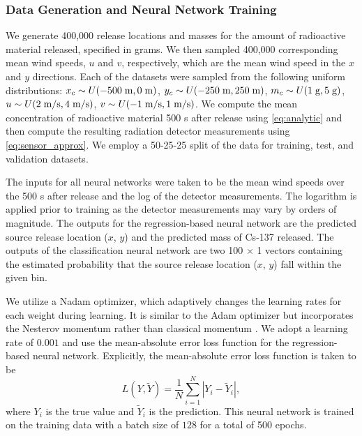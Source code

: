 \documentclass[sn-mathphys-ay]{sn-jnl}
\begin{document}
\subsubsection{Data Generation and Neural Network Training}
\label{sec:NN_training}
We generate 400{,}000 release locations and masses for the amount of radioactive material released, specified in grams. We then sampled 400{,}000 corresponding mean wind speeds, $u$ and $v$, respectively, which are the mean wind speed in the $x$ and $y$ directions. Each of the datasets were sampled from the following uniform distributions: $x_c \sim U(-500 \hspace{1mm} \text{m},0 \hspace{1mm} \text{m})$,  $y_c \sim U(-250 \hspace{1mm} \text{m},250 \hspace{1mm} \text{m})$, $m_c \sim U(1 \hspace{1mm} \text{g},5 \hspace{1mm} \text{g})$, $u \sim U(2 \hspace{1mm} \text{m/s},4 \hspace{1mm} \text{m/s})$, $v \sim U(-1 \hspace{1mm} \text{m/s},1 \hspace{1mm} \text{m/s})$. We compute the mean concentration of radioactive material 500 s after release using \eqref{eq:analytic} and then compute the resulting radiation detector measurements using \eqref{eq:sensor_approx}. We employ a 50-25-25 split of the data for training, test, and validation datasets.

The inputs for all neural networks were taken to be the mean wind speeds over the 500 s after release and the log of the detector measurements. The logarithm is applied prior to training as the detector measurements may vary by orders of magnitude. The outputs for the regression-based neural network are the predicted source release location ($x$, $y$) and the predicted mass of Cs-137 released. The outputs of the classification neural network are two 100 $\times$ 1 vectors containing the estimated probability that the source release location ($x$, $y$) fall within the given bin.

We utilize a Nadam optimizer, which adaptively changes the learning rates for each weight during learning. It is similar to the Adam optimizer but incorporates the Nesterov momentum rather than classical momentum \citep{Nadam, Hal}. We adopt a learning rate of $0.001$ and use the mean-absolute error loss function for the regression-based neural network. Explicitly, the mean-absolute error loss function is taken to be
\begin{equation}
\label{eq:MAE}
L(Y,\tilde{Y})=\frac{1}{N}\sum_{i=1}^N |Y_i-\tilde{Y}_i|,
\end{equation}
where $Y_i$ is the true value and $\tilde{Y}_i$ is the prediction. This neural network is trained on the training data with a batch size of $128$ for a total of 500 epochs.
\end{document}
